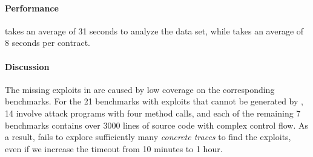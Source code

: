 \paragraph{Performance}
\teether takes an average of 31 seconds to analyze the \etherscan data set, 
while \toolname takes an average of 8 seconds per contract.

\paragraph{Discussion} 

The missing exploits in \teether are caused by low coverage on the
corresponding benchmarks. For the 21 benchmarks with exploits that cannot be generated by \teether, 
14 involve attack programs with four method calls, and each of the remaining 7 
benchmarks contains over 3000 lines of source code with complex control flow.
As a result,  \teether  fails to explore sufficiently many \emph{concrete traces} to 
find the exploits, even if we increase the timeout from 10 minutes to 1 hour.  



